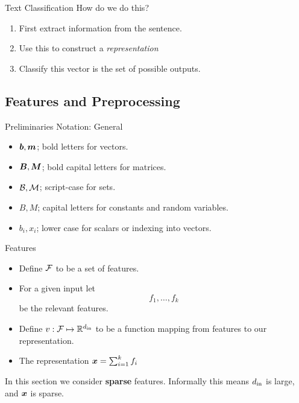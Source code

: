 \documentclass{beamer}
\begin{document}
\begin{frame}{Text Classification}
  How do we do this? 

  \begin{enumerate}
  \item First extract information from the sentence. 
  \item Use this to construct a \textit{representation}
  \item Classify this vector is the set of possible outputs.
  \end{enumerate}

\end{frame}




\subsection{Features and Preprocessing}

\begin{frame}{Preliminaries Notation: General}
  \begin{itemize}
  \item $\boldsymbol{b}, \boldsymbol{m}$;  bold letters for vectors.
  \item $\boldsymbol{B}, \boldsymbol{M}$;  bold capital letters for matrices.
  \item $\mathcal{B}, \mathcal{M}$;  script-case for sets.
  \item $B, M$; capital letters for constants and random variables.
  \item $b_i, x_i$; lower case for scalars or indexing into vectors.
  \end{itemize}
\end{frame}


\begin{frame}{Features}
  \begin{itemize}
  \item   Define $\mathcal{F}$ to be a set of features. 
  \item   For a given input let \[f_1, \ldots , f_k\]
  be the relevant features. 
  \item   Define $v: \mathcal{F} \mapsto \mathbb{R}^{d_{\mathrm{in}}}$ to be a function mapping 
  from features to our representation. 
  \item The representation $\boldsymbol{x} = \sum_{i=1}^k f_i $ 
  \end{itemize}

  In this section we consider \textbf{sparse} features. Informally this means
  $d_{\mathrm{in}}$ is large, and $\boldsymbol{x}$ is sparse.   
\end{frame}
\end{document}
